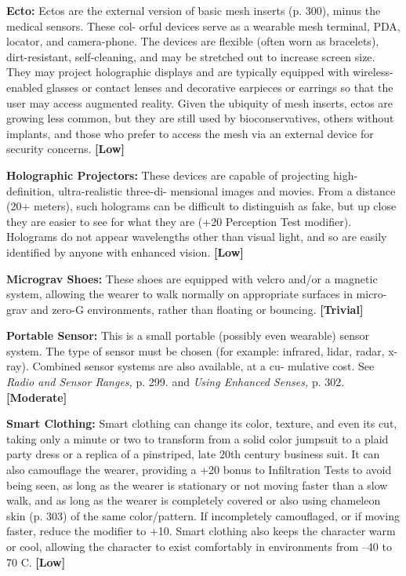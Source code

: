 \textbf{Ecto:} Ectos are the external version of basic mesh 
inserts (p. 300), minus the medical sensors. These col-
orful devices serve as a wearable mesh terminal, PDA, 
locator, and camera-phone. The devices are flexible 
(often worn as bracelets), dirt-resistant, self-cleaning, 
and may be stretched out to increase screen size. They 
may project holographic displays and are typically 
equipped with wireless-enabled glasses or contact 
lenses and decorative earpieces or earrings so that the 
user may access augmented reality. Given the ubiquity 
of mesh inserts, ectos are growing less common, but 
they are still used by bioconservatives, others without 
implants, and those who prefer to access the mesh via 
an external device for security concerns. \textbf{[Low]}

\textbf{Holographic Projectors: }These devices are capable 
of projecting high-definition, ultra-realistic three-di-
mensional images and movies. From a distance (20+ 
meters), such holograms can be difficult to distinguish 
as fake, but up close they are easier to see for what they 
are (+20 Perception Test modifier). Holograms do not 
appear wavelengths other than visual light, and so are 
easily identified by anyone with enhanced vision. \textbf{[Low]}

\textbf{Micrograv Shoes:} These shoes are equipped with 
velcro and/or a magnetic system, allowing the wearer 
to walk normally on appropriate surfaces in micro-
grav and zero-G environments, rather than floating or 
bouncing. \textbf{[Trivial]}

\textbf{Portable Sensor:} This is a small portable (possibly 
even wearable) sensor system. The type of sensor must 
be chosen (for example: infrared, lidar, radar, x-ray). 
Combined sensor systems are also available, at a cu-
mulative cost. See \textit{Radio and Sensor Ranges,} p. 299. 
and \textit{Using Enhanced Senses,} p. 302. \textbf{[Moderate]}

\textbf{Smart Clothing: }Smart clothing can change its 
color, texture, and even its cut, taking only a minute 
or two to transform from a solid color jumpsuit to a 
plaid party dress or a replica of a pinstriped, late 20th 
century business suit. It can also camouflage the wearer, 
providing a +20 bonus to Infiltration Tests to avoid 
being seen, as long as the wearer is stationary or not 
moving faster than a slow walk, and as long as the 
wearer is completely covered or also using chameleon 
skin (p. 303) of the same color/pattern. If incompletely 
camouflaged, or if moving faster, reduce the modifier 
to +10. Smart clothing also keeps the character warm 
or cool, allowing the character to exist comfortably in 
environments from –40 to 70 C. \textbf{[Low]}

